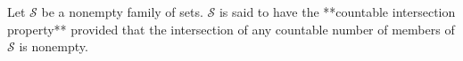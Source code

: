 Let $\mathcal{S}$ be a nonempty family of sets. $\mathcal{S}$ is said to have the **countable intersection property** provided that the intersection of any countable number of members of $\mathcal{S}$ is nonempty.
